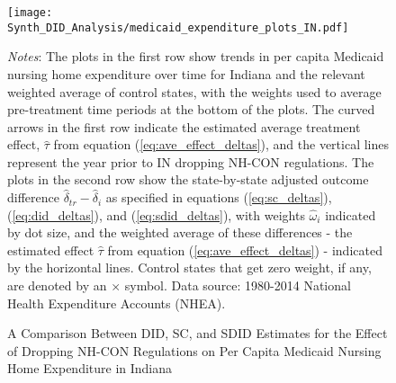 \documentclass[../Main.tex]{subfiles}
\begin{document}
\newpage
\begin{figure}[t] 
	\begin{center}
	\caption{\label{fig:med_exp_plots_in} \centering A Comparison Between DID, SC, and SDID Estimates for the Effect of Dropping NH-CON Regulations on Per Capita Medicaid Nursing Home Expenditure in Indiana}
    \texttt{[image: Synth\_DID\_Analysis/medicaid\_expenditure\_plots\_IN.pdf]}
    \end{center}
    \footnotesize
		\textit{Notes}: The plots in the first row show trends in per capita Medicaid nursing home expenditure over time for Indiana and the relevant weighted average of control states, with the weights used to average pre-treatment time periods at the bottom of the plots. The curved arrows in the first row indicate the estimated average treatment effect, $\hat{\tau}$ from equation (\ref{eq:ave_effect_deltas}), and the vertical lines represent the year prior to IN dropping NH-CON regulations. The plots in the second row show the state-by-state adjusted outcome difference $\hat{\delta}_{tr}-\hat{\delta}_i$ as specified in equations (\ref{eq:sc_deltas}), (\ref{eq:did_deltas}), and (\ref{eq:sdid_deltas}), with weights $\hat{\omega}_i$ indicated by dot size, and the weighted average of these differences - the estimated effect $\hat{\tau}$ from equation (\ref{eq:ave_effect_deltas}) - indicated by the horizontal lines. Control states that get zero weight, if any, are denoted by an $\times$ symbol. Data source: 1980-2014 National Health Expenditure Accounts (NHEA).
\end{figure}
\clearpage
\end{document}
